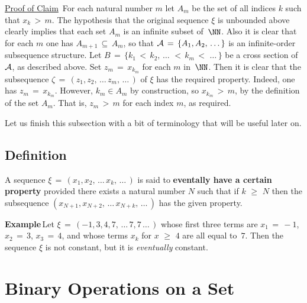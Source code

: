         \underline{Proof of Claim}\, For each natural number $m$ let $A_{m}$ be the set of all indices $k$ such that $x_{k}\,>\,m$.
    The hypothesis that the original sequence ${\xi}$ is unbounded above clearly implies that each set $A_{m}$ is an infinite subset of~${\NN}$.
    Also it is clear that for each $m$ one has $A_{m+1} \,{\subseteq}\, A_{m}$,
    so that ${\cal A} \,=\, \{A_{1}, A_{2},\,{\ldots}\,\}$ is an infinite-order subsequence structure.
    Let $B \,=\, \{k_{1}\,<\,k_{2},\,{\ldots}\,\,<\,k_{m}\,<\,\,{\ldots}\,\}$ be a cross section of ${\cal A}$, as described above. Set $z_{m} \,=\, x_{k_{m}}$ for each $m$ in~${\NN}$.
    Then it is clear that the subsequence ${\zeta} \,=\, (z_{1}, z_{2},\,{\ldots}\,z_{m},\,{\ldots}\,)$ of ${\xi}$ has the required property.
    Indeed, one has $z_{m} \,=\, x_{k_{m}}$. However, $k_{m}{\in}A_{m}$ by construction, so $x_{k_{m}}\,>\,m$, by the definition of the set $A_{m}$.
    That is, $z_{m}\,>\,m$ for each index $m$, as required.

\V

        Let us finish this subsection with a bit of terminology that will be useful later on.

\VV
        \subsection{\small{{\bf Definition}}}
        \label{DefA40.80}

        A sequence ${\xi} \,=\, (x_{1}, x_{2},\,{\ldots}\,x_{k},\,{\ldots}\,)$ is said to {\bf eventally have a certain property}
    provided there exists a natural number $N$ such that if $k\,\,{\geq}\,\,N$ then the subsequence $(x_{N+1}, x_{N+2},\,{\ldots}\,x_{N+k},\,{\ldots}\,)$ has the given property.

\V

        {\bf Example}\,Let ${\xi} \,=\, (-1, 3, 4, 7, \,{\ldots}\,7, 7\,{\ldots}\,)$ whose first three terms are $x_{1} \,=\, -1$, $x_{2} \,=\, 3$, $x_{3} \,=\, 4$,
    and whose terms $x_{k}$ for $x\,\,{\geq}\,\,4$ are all equal to~$7$. Then the sequence ${\xi}$ is not constant, but it is {\em eventually} constant.



        \section{{\bf Binary Operations on a Set}}
        \label{SectA60}

